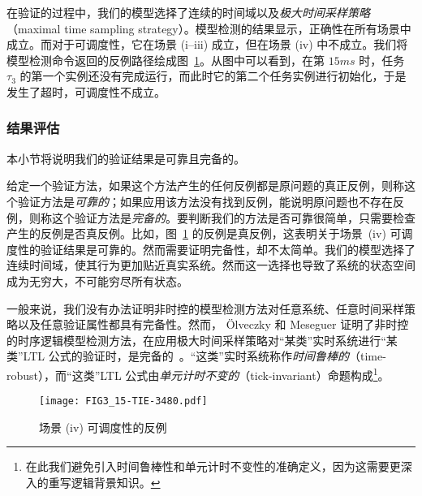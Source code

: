 在验证的过程中，我们的模型选择了连续的时间域以及\emph{极大时间采样策略}（maximal time sampling strategy）。模型检测的结果显示，正确性在所有场景中成立。而对于可调度性，它在场景 (i--iii) 成立，但在场景 (iv) 中不成立。我们将模型检测命令返回的反例路径绘成图~\ref{f:counterexample}。从图中可以看到，在第 $15ms$ 时，任务 $\tau_3$ 的第一个实例还没有完成运行，而此时它的第二个任务实例进行初始化，于是发生了超时，可调度性不成立。


\subsubsection{结果评估}
本小节将说明我们的验证结果是可靠且完备的。

给定一个验证方法，如果这个方法产生的任何反例都是原问题的真正反例，则称这个验证方法是\emph{可靠的}；如果应用该方法没有找到反例，能说明原问题也不存在反例，则称这个验证方法是\emph{完备的}。要判断我们的方法是否可靠很简单，只需要检查产生的反例是否真反例。比如，图~\ref{f:counterexample} 的反例是真反例，这表明关于场景~(iv) 可调度性的验证结果是可靠的。然而需要证明完备性，却不太简单。我们的模型选择了连续时间域，使其行为更加贴近真实系统。然而这一选择也导致了系统的状态空间成为无穷大，不可能穷尽所有状态。

一般来说，我们没有办法证明非时控的模型检测方法对任意系统、任意时间采样策略以及任意验证属性都具有完备性。然而， \"Olveczky 和 Meseguer 证明了非时控的时序逻辑模型检测方法，在应用极大时间采样策略对“某类”实时系统进行“某类”LTL 公式的验证时，是完备的~\cite{DBLP:journals/entcs/OlveczkyM07a}。“这类”实时系统称作\emph{时间鲁棒的}（time-robust），而“这类”LTL 公式由\emph{单元计时不变的}（tick-invariant）命题构成\footnote{在此我们避免引入时间鲁棒性和单元计时不变性的准确定义，因为这需要更深入的重写逻辑背景知识。}。

\begin{landscape}
\begin{figure}[t]
\centering 
\texttt{[image: FIG3\_15-TIE-3480.pdf]}
\caption{场景 (iv) 可调度性的反例}
\label{f:counterexample}
\end{figure}
\end{landscape}

